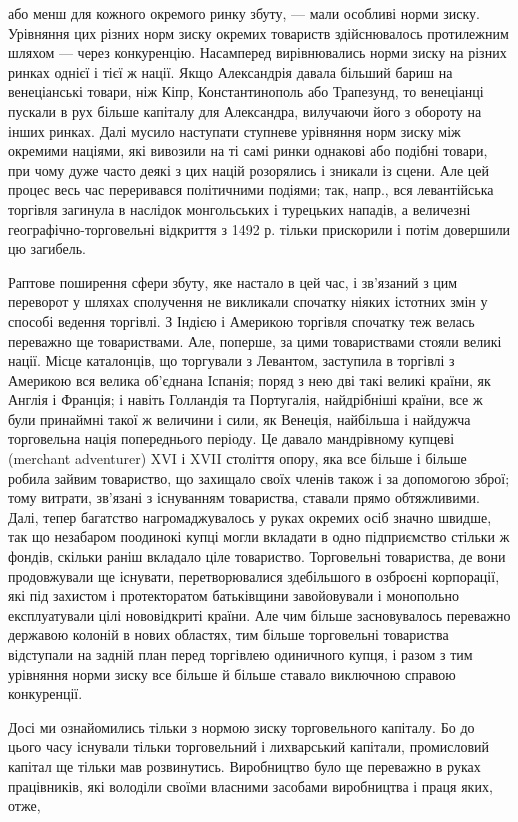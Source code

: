\parcont{}  %
або менш для кожного окремого ринку збуту, — мали особливі норми зиску. Урівняння цих різних норм зиску окремих товариств здійснювалось протилежним шляхом — через конкуренцію. Насамперед вирівнювались норми зиску на різних ринках однієї і тієї ж
нації. Якщо Александрія давала більший бариш на венеціанські товари, ніж Кіпр, Константинополь або Трапезунд, то венеціанці
пускали в рух більше капіталу для Александра, вилучаючи його з обороту на інших ринках. Далі мусило наступати ступневе
урівняння норм зиску між окремими націями, які вивозили на ті самі ринки однакові або подібні товари, при чому дуже часто
деякі з цих націй розорялись і зникали із сцени. Але цей процес весь час переривався політичними подіями; так, напр., вся
левантійська торгівля загинула в наслідок монгольських і турецьких нападів, а величезні географічно-торговельні відкриття з
1492 р. тільки прискорили і потім довершили цю загибель.

Раптове поширення сфери збуту, яке настало в цей час, і зв’язаний з
цим переворот у шляхах сполучення не викликали спочатку ніяких істотних змін у способі ведення торгівлі. З Індією і Америкою
торгівля спочатку теж велась переважно ще товариствами. Але, поперше, за цими товариствами стояли великі нації. Місце
каталонців, що торгували з Левантом, заступила в торгівлі з Америкою вся велика об’єднана Іспанія; поряд з нею дві такі
великі країни, як Англія і Франція; і навіть Голландія та Португалія, найдрібніші країни, все ж були принаймні такої ж
величини і сили, як Венеція, найбільша і найдужча торговельна нація попереднього періоду. Це давало мандрівному купцеві (merchant adventurer) XVI і XVII століття опору, яка все більше і більше робила зайвим товариство, що захищало своїх членів
також і за допомогою зброї; тому витрати, зв’язані з існуванням товариства, ставали прямо обтяжливими. Далі, тепер багатство
нагромаджувалось у руках окремих осіб значно швидше, так що незабаром поодинокі купці могли вкладати в одно підприємство
стільки ж фондів, скільки раніш вкладало ціле товариство. Торговельні товариства, де вони продовжували ще існувати,
перетворювалися здебільшого в озброєні корпорації, які під захистом і протекторатом батьківщини завойовували і монопольно
експлуатували цілі нововідкриті країни. Але чим більше засновувалось переважно державою колоній в нових областях, тим більше
торговельні товариства відступали на задній план перед торгівлею одиничного купця, і разом з тим урівняння норми зиску все
більше й більше ставало виключною справою конкуренції.

Досі ми ознайомились тільки з нормою зиску торговельного капіталу. Бо
до цього часу існували тільки торговельний і лихварський капітали, промисловий капітал ще тільки мав розвинутись.
Виробництво було ще переважно в руках працівників, які володіли своїми власними засобами виробництва і праця яких, отже,
\parbreak{}  %
